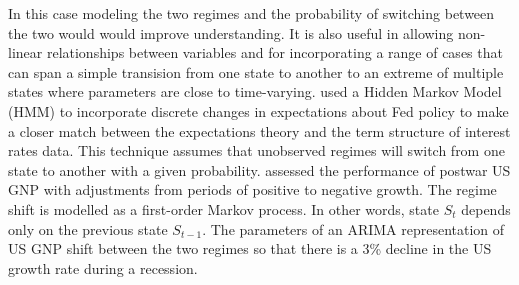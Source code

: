 \documentclass[12pt, a4paper, oneside]{article} %
\begin{document}
In this case modeling the two regimes and the probability of switching between the two would would improve understanding.  It is also useful in allowing non-linear relationships between variables and for incorporating a range of cases that can span a simple transision from one state to another to an extreme of multiple states where parameters are close to time-varying.  \citet{hamilton1988rational} used a Hidden Markov Model (HMM) to incorporate discrete changes in expectations about Fed policy to make a closer match between the expectations theory and the term structure of interest rates data.  This technique assumes that unobserved regimes will switch from one state to another with a given probability.  \citet{Hamilton1989} assessed the performance of postwar US GNP with adjustments from periods of positive to negative growth. The regime shift is modelled as a first-order Markov process.  In other words, state $S_t$ depends only on the previous state $S_{t-1}$.  The parameters of an ARIMA representation of US GNP shift between the two regimes so that there is a 3\% decline in the US growth rate during a recession.  




\end{document}
